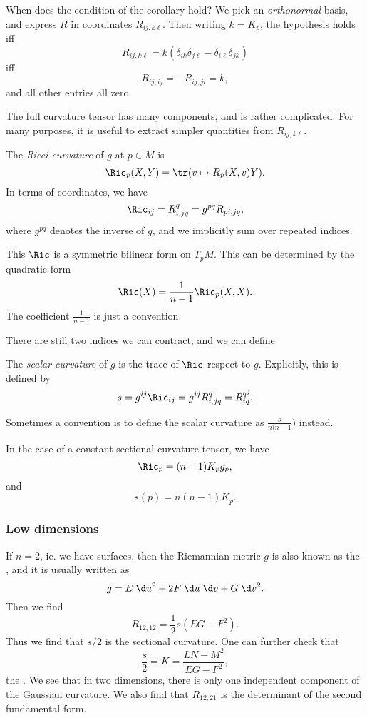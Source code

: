 \documentclass[a4paper]{article}
\begin{document}
When does the condition of the corollary hold? We pick an \emph{orthonormal} basis, and express $R$ in coordinates $R_{ij, k\ell}$. Then writing $k = K_p$, the hypothesis holds iff
\[
  R_{ij, k\ell} = k(\delta_{ik}\delta_{j\ell} - \delta_{i\ell} \delta_{jk})
\]
iff
\[
  R_{ij, ij} = - R_{ij, ji} = k,
\]
and all other entries all zero.

The full curvature tensor has many components, and is rather complicated. For many purposes, it is useful to extract simpler quantities from $R_{ij, k\ell}$.
\begin{defi}
  The \emph{Ricci curvature} of $g$ at $p \in M$ is
  \[
    \Ric_p(X, Y) = \tr(v \mapsto R_p(X, v) Y).
  \]
  In terms of coordinates, we have
  \[
    \Ric_{ij} = R^q_{i,jq} = g^{pq} R_{pi, jq},
  \]
  where $g^{pq}$ denotes the inverse of $g$, and we implicitly sum over repeated indices.

  This $\Ric$ is a symmetric bilinear form on $T_p M$. This can be determined by the quadratic form
  \[
    \Ric(X) = \frac{1}{n - 1} \Ric_p(X, X).
  \]
  The coefficient $\frac{1}{n - 1}$ is just a convention.
\end{defi}
There are still two indices we can contract, and we can define
\begin{defi}
  The \emph{scalar curvature} of $g$ is the trace of $\Ric$ respect to $g$. Explicitly, this is defined by
  \[
    s = g^{ij}\Ric_{ij} = g^{ij} R^q_{i, jq} = R^{qi}_{iq}.
  \]
\end{defi}
Sometimes a convention is to define the scalar curvature as $\frac{s}{n(n - 1})$ instead.

In the case of a constant sectional curvature tensor, we have
\[
  \Ric_p = (n - 1) K_p g_p,
\]
and
\[
  s(p) = n(n - 1) K_p.
\]

\subsubsection*{Low dimensions}
If $n = 2$, ie. we have surfaces, then the Riemannian metric $g$ is also known as the , and it is usually written as
\[
  g = E\;\d u^2 + 2 F \;\d u\;\d v + G \;\d v^2.
\]
Then we find
\[
  R_{12,12} = \frac{1}{2} s (EG - F^2).
\]
Thus we find that $s/2$ is the sectional curvature. One can further check that
\[
  \frac{s}{2} = K = \frac{LN - M^2}{EG - F^2},
\]
the . We see that in two dimensions, there is only one independent component of the Gaussian curvature. We also find that $R_{12, 21}$ is the determinant of the second fundamental form.
\end{document}
